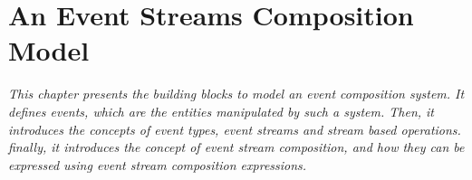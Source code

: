\chapter{An Event Streams Composition Model}
\label{ch3}
\textit{This chapter presents the building blocks to model an event composition system. It defines events, which are the entities manipulated by such a system. Then, it introduces the concepts of event types, event
streams and stream based operations. finally, it introduces the concept of event stream composition, and how they can be expressed using event stream composition expressions.}
\vspace{5cm}
\vspace{2ex}\vfill
\minitoc


